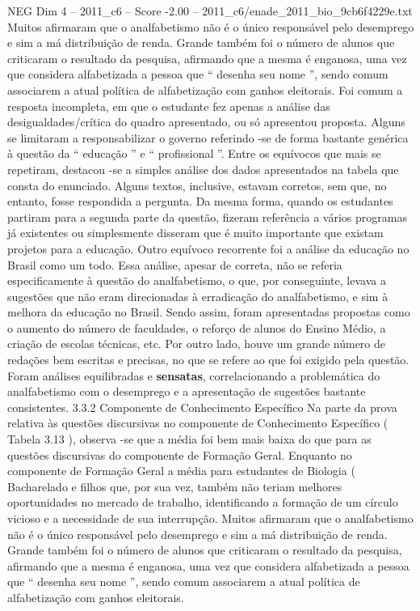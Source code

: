 \begin{textsample}{NEG Dim 4 – 2011\_c6 – Score -2.00 – 2011\_c6/enade\_2011\_bio\_9cb6f4229e.txt}
Muitos afirmaram que o analfabetismo não é o único responsável pelo desemprego e sim a má distribuição de renda.
Grande também foi o número de alunos que criticaram o resultado da pesquisa, afirmando que a mesma é enganosa, uma vez que considera alfabetizada a pessoa que “ desenha seu nome ”, sendo comum associarem a atual política de alfabetização com ganhos eleitorais.
Foi comum a resposta incompleta, em que o estudante fez apenas a análise das desigualdades/crítica do quadro apresentado, ou só apresentou proposta.
Alguns se limitaram a responsabilizar o governo referindo -se de forma bastante genérica à questão da “ educação ” e “ profissional ”.
Entre os equívocos que mais se repetiram, destacou -se a simples análise dos dados apresentados na tabela que consta do enunciado.
Alguns textos, inclusive, estavam corretos, sem que, no entanto, fosse respondida a pergunta.
Da mesma forma, quando os estudantes partiram para a segunda parte da questão, fizeram referência a vários programas já existentes ou simplesmente disseram que é muito importante que existam projetos para a educação.
Outro equívoco recorrente foi a análise da educação no Brasil como um todo.
Essa análise, apesar de correta, não se referia especificamente à questão do analfabetismo, o que, por conseguinte, levava a sugestões que não eram direcionadas à erradicação do analfabetismo, e sim à melhora da educação no Brasil.
Sendo assim, foram apresentadas propostas como o aumento do número de faculdades, o reforço de alunos do Ensino Médio, a criação de escolas técnicas, etc.
Por outro lado, houve um grande número de redações bem escritas e precisas, no que se refere ao que foi exigido pela questão.
Foram análises equilibradas e \textbf{sensatas}, correlacionando a problemática do analfabetismo com o desemprego e a apresentação de sugestões bastante consistentes. 3.3.2 Componente de Conhecimento Específico Na parte da prova relativa às questões discursivas no componente de Conhecimento Específico ( Tabela 3.13 ), observa -se que a média foi bem mais baixa do que para as questões discursivas do componente de Formação Geral.
Enquanto no componente de Formação Geral a média para estudantes de Biologia ( Bacharelado e filhos que, por sua vez, também não teriam melhores oportunidades no mercado de trabalho, identificando a formação de um círculo vicioso e a necessidade de sua interrupção.
Muitos afirmaram que o analfabetismo não é o único responsável pelo desemprego e sim a má distribuição de renda.
Grande também foi o número de alunos que criticaram o resultado da pesquisa, afirmando que a mesma é enganosa, uma vez que considera alfabetizada a pessoa que “ desenha seu nome ”, sendo comum associarem a atual política de alfabetização com ganhos eleitorais.

\end{textsample}
